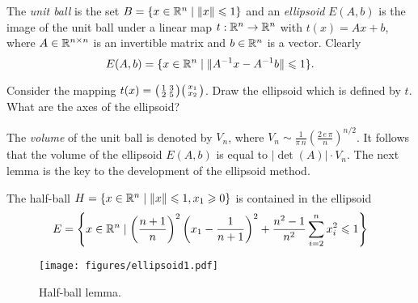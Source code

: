 The \emph{unit ball} is the set $B = \{ x \in \mathbb{R}^n \mid \|x\|\leqslant1\}$ and an
\emph{ellipsoid} $E(A,b)$ is the image of the unit ball under a linear map
$t:\mathbb{R}^n\to\mathbb{R}^n$ with $t(x) = Ax +b$, where $A \in \mathbb{R}^{n\times n}$ is an invertible
matrix and $b \in \mathbb{R}^n$ is a vector.  Clearly 
\begin{equation}
  \label{el:eq:13}
  E(A,b) =  \{ x \in \mathbb{R}^n \mid \|  A^{-1} x - A^{-1} b \| \leqslant1\}. 
\end{equation}
%



\begin{exercise}
  \label{el:ex:8}
  Consider the mapping $t(x) = \big(\begin{smallmatrix} 1 & 3 \\ 2 & 5 \end{smallmatrix}\big)
  \big(\begin{smallmatrix} x_1\\x_2 \end{smallmatrix}\big)$. Draw the ellipsoid which is defined by $t$. What
  are the axes of the ellipsoid? 
\end{exercise}


The \emph{volume} of the unit ball is denoted by $V_n$, where $V_n \sim
\frac{1}{\pi\,n} \left( \frac{2\,e\,\pi}{n}\right)^{n/2}$. It follows that
the volume of the ellipsoid $E(A,b)$ is equal to $|\det(A)| \cdot V_n$.
The next lemma is the key to the development of the ellipsoid method. 

\begin{lemma}
  \label{el:lem:12}
  The half-ball $H=\{x \in \mathbb{R}^n \mid \|x\|\leqslant1, x_1\geqslant0\}$ is contained in the
  ellipsoid 
  \begin{equation}
    \label{el:eq:13}
    E = \left\{ x \in \mathbb{R}^n \mid \left(\frac{n+1}{n}\right)^2  \left( x_1 -
      \frac{1}{n+1}\right)^2 + \frac{n^2-1}{n^2} \sum_{i=2}^n x_i^2 \leqslant1 \right\}
  \end{equation}
\end{lemma}



\begin{figure}[htbp]
  \centering 
  {
    \texttt{[image: figures/ellipsoid1.pdf]}
  }
  \caption{Half-ball lemma.}
  \label{el:fig:half-ball}
\end{figure}


